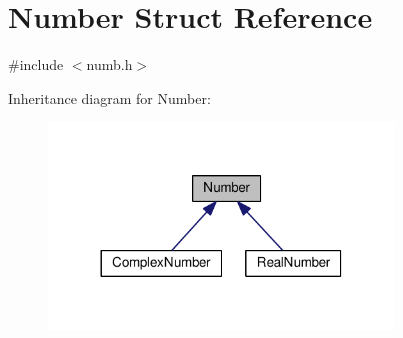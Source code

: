 \hypertarget{structNumber}{}\section{Number Struct Reference}
\label{structNumber}


{\ttfamily \#include $<$numb.\+h$>$}



Inheritance diagram for Number\+:\nopagebreak
\begin{figure}[H]
\begin{center}
\leavevmode
\includegraphics[width=260pt]{structNumber__inherit__graph}
\end{center}
\end{figure}
